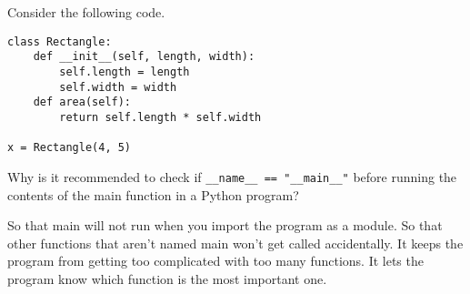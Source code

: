 \documentclass[12pt,answers]{exam}
\begin{document}
\begin{questions}

\question Consider the following code. 


\begin{verbatim}
class Rectangle:
    def __init__(self, length, width):
        self.length = length
        self.width = width
    def area(self):
        return self.length * self.width

x = Rectangle(4, 5)
\end{verbatim}

\question Why is it recommended to check if \verb|__name__ == "__main__"| before running the contents of the main function in a Python program?  
\begin{choices}
\CorrectChoice So that main will not run when you import the program as a module. 
\choice So that other functions that aren't named main won't get called accidentally. 
\choice It keeps the program from getting too complicated with too many functions. 
\choice It lets the program know which function is the most important one. 
\end{choices}

\end{questions}
\end{document}
